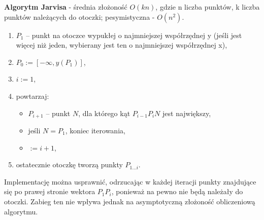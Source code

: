 \documentclass[12pt]{article}
\begin{document}
    \begin{definition}
        \textbf{Algorytm Jarvisa} - średnia złożoność $O(kn)$, gdzie n liczba punktów, k liczba punktów należących do otoczki; pesymistyczna - $O(n^2)$.
        \begin{enumerate}
            \item $P_1$ – punkt na otoczce wypukłej o najmniejszej współrzędnej y (jeśli jest więcej niż jeden, wybierany jest ten o najmniejszej współrzędnej x),
            \item $P_{0}:=[-\infty ,y(P_{1})]$,
            \item $i:=1$,
            \item powtarzaj:
            \begin{itemize}
                \item $P_{i+1}$ – punkt $N$, dla którego kąt $P_{i-1}P_{i}N$ jest największy,
                \item jeśli $N=P_{1}$, koniec iterowania,
                \item $:=i+1$,
            \end{itemize}
            \item ostatecznie otoczkę tworzą punkty $P_{1\dots i}$.
        \end{enumerate}

        Implementację można usprawnić, odrzucając w każdej iteracji punkty znajdujące się po prawej stronie wektora $P_{1}P_{i}$, ponieważ na pewno nie będą należały do otoczki. Zabieg ten nie wpływa jednak na asymptotyczną złożoność obliczeniową algorytmu.
    \end{definition}
\end{document}
